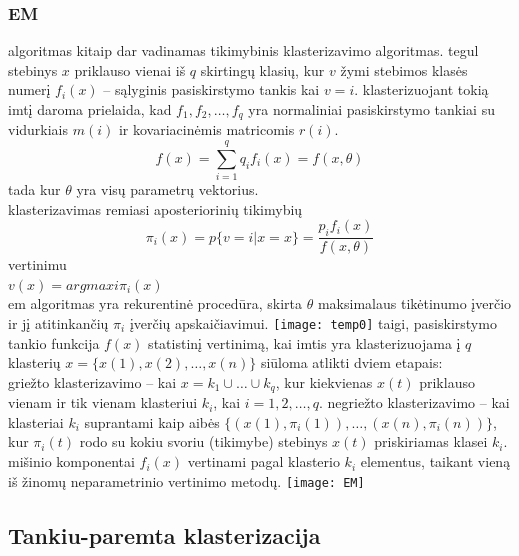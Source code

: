 \documentclass{VUMIFInfKursinis}
\begin{document}
		\subsubsection{EM}
			 algoritmas kitaip dar vadinamas tikimybinis klasterizavimo algoritmas.  tegul stebinys $x$ priklauso vienai iš $q$ skirtingų klasių, kur $v$ žymi stebimos klasės numerį $f_i(x)$ – sąlyginis pasiskirstymo tankis kai $v = i$. klasterizuojant tokią imtį daroma prielaida, kad $f_1,f_2,\ldots,f_q$ yra normaliniai pasiskirstymo tankiai su vidurkiais $m(i)$ ir kovariacinėmis matricomis $r(i)$.\\
			\begin{equation}
				f(x)=\sum^q_{i=1} {q_i f_i (x) = f(x, \theta)}
			\end{equation} 
			tada
			kur $\theta$ yra visų parametrų vektorius.\\
			klasterizavimas remiasi aposteriorinių tikimybių
			\begin{equation}
				\pi_i (x) = p\{v = i |x = x\} = \frac{p_i f_i(x)}{f(x,\theta)}
			\end{equation} 
			vertinimu\\
			$v(x) = argmaxi \pi_i(x)$\\
			em algoritmas yra rekurentinė procedūra, skirta $\theta$ maksimalaus tikėtinumo įverčio ir jį atitinkančių $\pi_i$ įverčių apskaičiavimui.
			\texttt{[image: temp0]}
			taigi, pasiskirstymo tankio funkcija $f(x)$ statistinį vertinimą, kai imtis yra klasterizuojama į $q$ klasterių $x = \{x(1), x(2), \ldots, x(n)\}$ siūloma atlikti dviem etapais:\\
			griežto klasterizavimo – kai $x = k_1\cup  \ldots \cup k_q$, kur kiekvienas $x(t)$ priklauso vienam ir tik vienam klasteriui $k_i$, kai $i = 1, 2, \ldots, q$.
			negriežto klasterizavimo – kai klasteriai $k_i$ suprantami kaip aibės $\{(x(1), \pi_i (1)), \ldots, (x(n), \pi_i(n))\}$, kur $\pi_i(t)$ rodo su kokiu svoriu (tikimybe) stebinys $x(t)$ priskiriamas klasei $k_i$. mišinio komponentai $f_i(x)$ vertinami pagal klasterio $k_i$ elementus, taikant vieną iš žinomų neparametrinio vertinimo metodų.
			\texttt{[image: EM]}

	\subsection{Tankiu-paremta klasterizacija}
\end{document}
